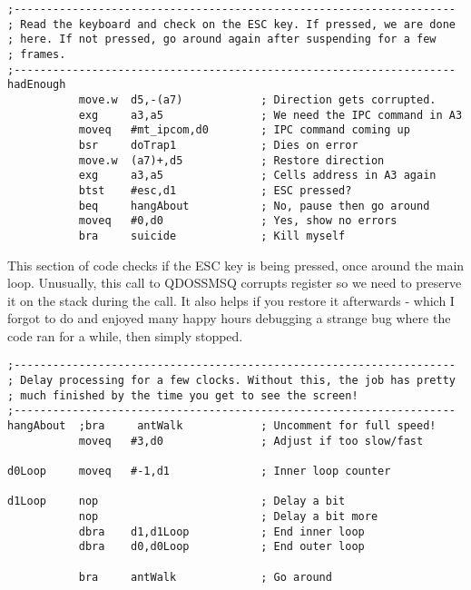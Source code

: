 \begin{lstlisting}[firstnumber=last,caption={Langtons Ant - Checking ESC}]
;--------------------------------------------------------------------
; Read the keyboard and check on the ESC key. If pressed, we are done 
; here. If not pressed, go around again after suspending for a few
; frames.
;--------------------------------------------------------------------
hadEnough
           move.w  d5,-(a7)            ; Direction gets corrupted.
           exg     a3,a5               ; We need the IPC command in A3
           moveq   #mt_ipcom,d0        ; IPC command coming up
           bsr     doTrap1             ; Dies on error
           move.w  (a7)+,d5            ; Restore direction
           exg     a3,a5               ; Cells address in A3 again
           btst    #esc,d1             ; ESC pressed?
           beq     hangAbout           ; No, pause then go around
           moveq   #0,d0               ; Yes, show no errors
           bra     suicide             ; Kill myself

\end{lstlisting}

This section of code checks if the ESC key is being pressed, once around the main loop. Unusually, this call to QDOSSMSQ corrupts register  so we need to preserve it on the stack during the call. It also helps if you restore it afterwards - which I forgot to do and enjoyed many happy hours debugging a strange bug where the code ran for a while, then simply stopped.

\begin{lstlisting}[firstnumber=last,caption={Langtons Ant - Delaying Tactics}]
;--------------------------------------------------------------------
; Delay processing for a few clocks. Without this, the job has pretty
; much finished by the time you get to see the screen!
;--------------------------------------------------------------------
hangAbout  ;bra     antWalk            ; Uncomment for full speed!
           moveq   #3,d0               ; Adjust if too slow/fast

d0Loop     moveq   #-1,d1              ; Inner loop counter

d1Loop     nop                         ; Delay a bit
           nop                         ; Delay a bit more
           dbra    d1,d1Loop           ; End inner loop
           dbra    d0,d0Loop           ; End outer loop           

           bra     antWalk             ; Go around

\end{lstlisting}

